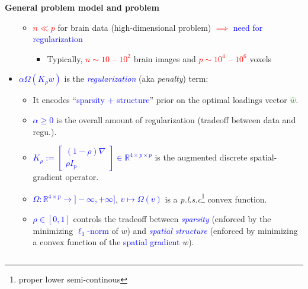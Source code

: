 \documentclass[french]{STIC_poster}
\begin{document}
\begin{frame}[t]
\begin{columns}[t]
\begin{column}{.48\linewidth}
\begin{sxbox}[\textwidth]{\textbf{General problem model and problem}}
\begin{itemize}
\begin{itemize}
                                        \item \textcolor{red}{$n \ll p$} for brain data (high-dimensional problem) \textcolor{red}{$\implies$} \textcolor{blue}{need for regularization}
                                          \begin{itemize}
                                          \item Typically, \textcolor{red}{$n \sim 10$ -- $10^2$} brain images and \textcolor{red}{$p \sim 10^4$ -- $10^6$} voxels
                                          \end{itemize}
                                      \end{itemize}
                                    \item \textcolor{blue}{$\alpha \Omega(K_{\rho}w)$} is the \textcolor{blue}{\textit{regularization}} (aka \textit{penalty}) term:
                                    \begin{itemize}
                                      \item It encodes ``\textcolor{blue}{sparsity + structure}'' prior on the optimal loadings vector \textcolor{green}{$\hat{w}$}.
                                      \item \textcolor{blue}{$\alpha \ge 0$} is the overall amount of regularization (tradeoff between data and regu.).
                                      \item \textcolor{blue}{$K_{\rho} := \begin{bmatrix}(1-\rho)\nabla \\ \rho I_p\end{bmatrix} \in \mathbb{R}^{4 \times p \times p}$}
                                        is the augmented discrete spatial-gradient operator.
                                      \item \textcolor{blue}{$\Omega: \mathbb{R}^{4 \times p} \rightarrow ]-\infty,+\infty]$}, \textcolor{blue}{$v \mapsto \Omega(v)$}
                                          is a \textit{p.l.s.c}\footnote{proper lower semi-continous} convex function.
                                        \item \textcolor{blue}{$\rho \in [0, 1]$} controls the tradeoff between \textcolor{blue}{\textit{sparsity}}
                                          (enforced by the minimizing \textcolor{blue}{$\ell_1$-norm} of $w$) and
                                          \textcolor{blue}{\textit{spatial structure}} (enforced by minimizing a convex function of the \textcolor{blue}{spatial gradient} $w$).

\end{itemize}
\end{itemize}
\end{sxbox}
\end{column}
\end{columns}
\end{frame}
\end{document}
